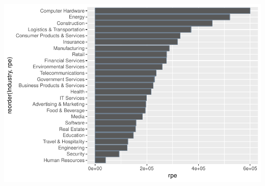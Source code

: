 \documentclass[]{article}
\begin{document}
\includegraphics{DATA_608_Project_1_files/figure-latex/unnamed-chunk-11-1.pdf}
\end{document}
